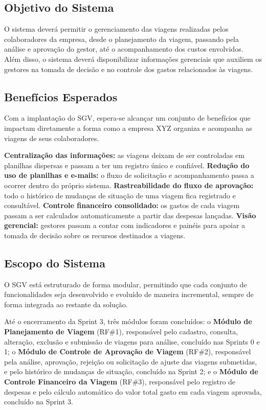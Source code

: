 \documentclass[12pt,article,oneside,a4paper]{abntex2}
\begin{document}
\subsection{Objetivo do Sistema}

O sistema deverá permitir o gerenciamento das viagens realizadas pelos
colaboradores da empresa, desde o planejamento da viagem, passando pela análise e
aprovação do gestor, até o acompanhamento dos custos envolvidos. Além disso, o
sistema deverá disponibilizar informações gerenciais que auxiliem os gestores na
tomada de decisão e no controle dos gastos relacionados às viagens.

\subsection{Benefícios Esperados}

Com a implantação do SGV, espera-se alcançar um conjunto de benefícios que
impactam diretamente a forma como a empresa XYZ organiza e acompanha as viagens
de seus colaboradores.

\textbf{Centralização das informações:} as viagens deixam de ser controladas em
planilhas dispersas e passam a ter um registro único e confiável.
\textbf{Redução do uso de planilhas e e-mails:} o fluxo de solicitação e
acompanhamento passa a ocorrer dentro do próprio sistema.
\textbf{Rastreabilidade do fluxo de aprovação:} todo o histórico de mudanças de
situação de uma viagem fica registrado e consultável.
\textbf{Controle financeiro consolidado:} os gastos de cada viagem passam a ser
calculados automaticamente a partir das despesas lançadas.
\textbf{Visão gerencial:} gestores passam a contar com indicadores e painéis
para apoiar a tomada de decisão sobre os recursos destinados a viagens.

\subsection{Escopo do Sistema}

O SGV está estruturado de forma modular, permitindo que cada conjunto de
funcionalidades seja desenvolvido e evoluído de maneira incremental, sempre de
forma integrada ao restante da solução.

Até o encerramento da Sprint 3, três módulos foram concluídos: o
\textbf{Módulo de Planejamento de Viagem} (RF\#1), responsável pelo cadastro,
consulta, alteração, exclusão e submissão de viagens para análise, concluído
nas Sprints 0 e 1; o \textbf{Módulo de Controle de Aprovação de Viagem}
(RF\#2), responsável pela análise, aprovação, rejeição ou solicitação de ajuste
das viagens submetidas, e pelo histórico de mudanças de situação, concluído na
Sprint 2; e o \textbf{Módulo de Controle Financeiro da Viagem} (RF\#3),
responsável pelo registro de despesas e pelo cálculo automático do valor
total gasto em cada viagem aprovada, concluído na Sprint 3.
\end{document}
